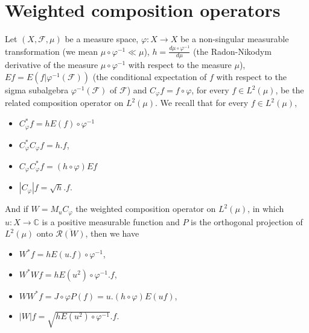 \documentclass{amsart}
\theoremstyle{definition}\newtheorem{defn}[thm]{Definition}
\theoremstyle{remark}
\numberwithin{equation}{section}
\begin{document}
\section{\sc\bf Weighted composition operators}
Let $(X, \mathcal{F}, \mu)$ be a measure space, $\varphi:X\rightarrow X$ be a non-singular measurable transformation (we mean $\mu\circ\varphi^{-1}\ll\mu$), $h=\frac{d\mu\circ\varphi^{-1}}{d\mu}$ (the Radon-Nikodym derivative of the measure $\mu\circ\varphi^{-1}$ with respect to the measure $\mu$), $Ef=E(f|\varphi^{-1}(\mathcal{F}))$ (the conditional expectation of $f$ with respect to the sigma subalgebra $\varphi^{-1}(\mathcal{F})$ of $\mathcal{F}$) and $C_{\varphi}f=f\circ\varphi$, for every $f\in L^2(\mu)$, be the related composition operator on $L^2(\mu)$.
We recall that for every $f\in L^2(\mu)$,
\begin{itemize}
 \item $C^*_{\varphi}f=hE(f)\circ\varphi^{-1}$
 \item $C^*_{\varphi}C_{\varphi}f=h.f$,
 \item $C_{\varphi}C^*_{\varphi}f=(h\circ\varphi)Ef$
 \item $|C_{\varphi}|f=\sqrt{h}.f$.
\end{itemize}
And if $W=M_uC_{\varphi}$ the weighted composition operator on $L^2(\mu)$, in which $u:X\rightarrow \mathbb{C}$ is a positive measurable function and $P$ is the orthogonal projection of $L^2(\mu)$ onto $\overline{\mathcal{R}(W)}$, then we have
\begin{itemize}
 \item $W^*f=hE(u.f)\circ\varphi^{-1}$,
 \item $W^*Wf=hE(u^2)\circ\varphi^{-1}.f$,
 \item $WW^*f=J\circ\varphi P(f)=u.(h\circ\varphi)E(uf)$,
 \item $|W|f=\sqrt{hE(u^2)\circ\varphi^{-1}}.f$.
\end{itemize}
\end{document}
